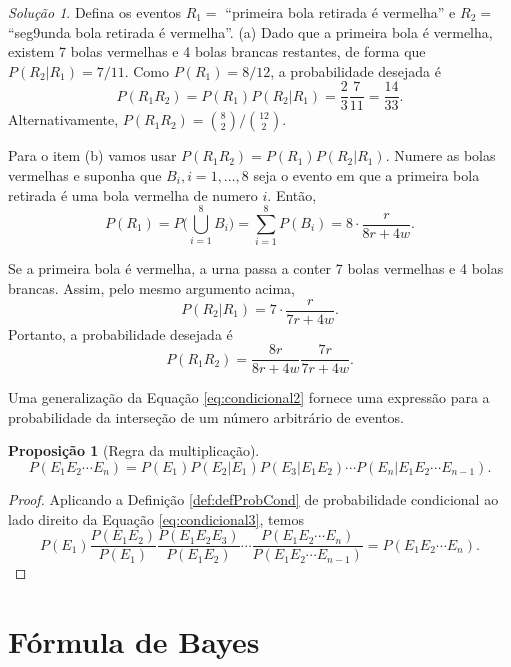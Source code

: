 \documentclass[]{book}
\newtheorem{proposition}{Proposição}[chapter]
\theoremstyle{definition}
\theoremstyle{definition}
\theoremstyle{definition}
\theoremstyle{remark}
\newtheorem*{solution}{Solução}
\begin{document}
\begin{solution}
\iffalse{} {Solução. } \fi{}Defina os eventos \(R_1 =\) ``primeira bola retirada é vermelha'' e \(R_2 =\) ``seg9unda bola retirada é vermelha''.
(a) Dado que a primeira bola é vermelha, existem 7 bolas vermelhas e 4 bolas brancas restantes, de forma que \(P(R_2|R_1) = 7/11\).
Como \(P(R_1)=8/12\), a probabilidade desejada é
\[P(R_1 R_2) = P(R_1)P(R_2|R_1) = \frac{2}{3}\frac{7}{11} = \frac{14}{33}.\]
Alternativamente, \(P(R_1 R_2) = {{8\choose 2}}/{{12\choose 2}}\).

Para o item (b) vamos usar \(P(R_1 R_2) = P(R_1)P(R_2 | R_1)\).
Numere as bolas vermelhas e suponha que \(B_i, i=1, \ldots, 8\) seja o evento em que a primeira bola retirada é uma bola vermelha de numero \(i\).
Então,
\[P(R_1) = P\Bigg(\bigcup_{i=1}^{8}B_i\Bigg) = \sum_{i=1}^{8}P(B_i) = 8\cdot \frac{r}{8r+4w}.\]

Se a primeira bola é vermelha, a urna passa a conter 7 bolas vermelhas e 4 bolas brancas.
Assim, pelo mesmo argumento acima,
\[P(R_2 | R_1) = 7\cdot \frac{r}{7r+4w}.\]
Portanto, a probabilidade desejada é
\[P(R_1 R_2) = \frac{8r}{8r+4w}\frac{7r}{7r+4w}.\]
\end{solution}

Uma generalização da Equação \eqref{eq:condicional2} fornece uma expressão para a probabilidade da interseção de um número arbitrário de eventos.

\begin{proposition}[Regra da multiplicação]
\protect\hypertarget{prp:unnamed-chunk-123}{}{\label{prp:unnamed-chunk-123} \iffalse (Regra da multiplicação) \fi{} }\begin{equation}
P(E_1 E_2 \cdots E_n) = P(E_1)P(E_2|E_1)P(E_3|E_1 E_2)\cdots P(E_n|E_1 E_2 \cdots E_{n-1}).
\label{eq:condicional3}
\end{equation}
\end{proposition}

\begin{proof}
\iffalse{} {Prova. } \fi{}Aplicando a Definição \ref{def:defProbCond} de probabilidade condicional ao lado direito da Equação \eqref{eq:condicional3}, temos
\[P(E_1) \frac{P(E_1E_2)}{P(E_1)} \frac{P(E_1 E_2 E_3)}{P(E_1 E_2)} \cdots \frac{P(E_1 E_2 \cdots E_n)}{P(E_1 E_2 \cdots E_{n-1})} = P(E_1 E_2 \cdots E_n).\]
\end{proof}

\hypertarget{fuxf3rmula-de-bayes}{%
\section{Fórmula de Bayes}\label{fuxf3rmula-de-bayes}}
\end{document}
